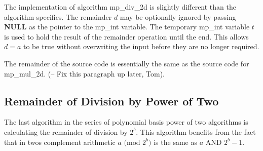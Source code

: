 \documentclass[b5paper]{book}
\begin{document}
The implementation of algorithm mp\_div\_2d is slightly different than the algorithm specifies.  The remainder $d$ may be optionally 
ignored by passing \textbf{NULL} as the pointer to the mp\_int variable.    The temporary mp\_int variable $t$ is used to hold the 
result of the remainder operation until the end.  This allows $d = a$ to be true without overwriting the input before they are no longer required.  

The remainder of the source code is essentially the same as the source code for mp\_mul\_2d.  (-- Fix this paragraph up later, Tom).

\subsection{Remainder of Division by Power of Two}

The last algorithm in the series of polynomial basis power of two algorithms is calculating the remainder of division by $2^b$.  This
algorithm benefits from the fact that in twos complement arithmetic $a \mbox{ (mod }2^b\mbox{)}$ is the same as $a$ AND $2^b - 1$.  
\end{document}

